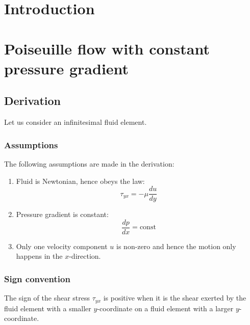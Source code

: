 \documentclass[10pt]{article}
\begin{document}
\setlength{\parindent}{0cm}
\clearpage

\tableofcontents

\setlength{\parskip}{1em}
\renewcommand{\baselinestretch}{1.0}

\section{Introduction}\label{chap:motivation}



\section{Poiseuille flow with constant pressure gradient}

\subsection{Derivation}

Let us consider an infinitesimal fluid element.

\subsubsection{Assumptions}

The following assumptions are made in the derivation:

\begin{enumerate}
\item Fluid is Newtonian, hence obeys the law:
\begin{equation}
\tau_{yx} = -\mu \frac{du}{dy}
\end{equation}
\item Pressure gradient is constant:
\begin{equation}
\frac{dp}{dx} = \text{const}
\end{equation}
\item Only one velocity component $u$ is non-zero and hence the motion only happens in the $x$-direction.
\end{enumerate}




\subsubsection{Sign convention}

The sign of the shear stress $\tau_{yx}$ is positive when it is the shear exerted by the fluid element with a smaller $y$-coordinate on a fluid element with a larger $y$-coordinate.
\end{document}
